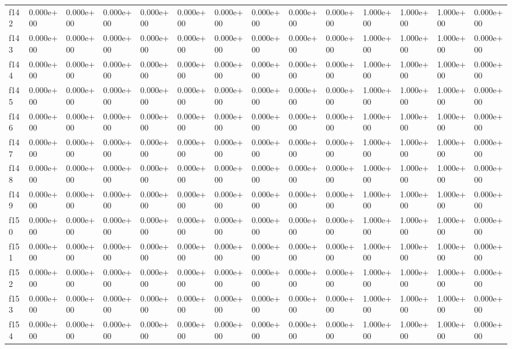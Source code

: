 \begin{table}
\begin{tabular}{llllllllllllll}
f142 & 0.000e+00 & 0.000e+00 & 0.000e+00 & 0.000e+00 & 0.000e+00 & 0.000e+00 & 0.000e+00 & 0.000e+00 & 0.000e+00 & 1.000e+00 & 1.000e+00 & 1.000e+00 & 0.000e+00 \\
f143 & 0.000e+00 & 0.000e+00 & 0.000e+00 & 0.000e+00 & 0.000e+00 & 0.000e+00 & 0.000e+00 & 0.000e+00 & 0.000e+00 & 1.000e+00 & 1.000e+00 & 1.000e+00 & 0.000e+00 \\
f144 & 0.000e+00 & 0.000e+00 & 0.000e+00 & 0.000e+00 & 0.000e+00 & 0.000e+00 & 0.000e+00 & 0.000e+00 & 0.000e+00 & 1.000e+00 & 1.000e+00 & 1.000e+00 & 0.000e+00 \\
f145 & 0.000e+00 & 0.000e+00 & 0.000e+00 & 0.000e+00 & 0.000e+00 & 0.000e+00 & 0.000e+00 & 0.000e+00 & 0.000e+00 & 1.000e+00 & 1.000e+00 & 1.000e+00 & 0.000e+00 \\
f146 & 0.000e+00 & 0.000e+00 & 0.000e+00 & 0.000e+00 & 0.000e+00 & 0.000e+00 & 0.000e+00 & 0.000e+00 & 0.000e+00 & 1.000e+00 & 1.000e+00 & 1.000e+00 & 0.000e+00 \\
f147 & 0.000e+00 & 0.000e+00 & 0.000e+00 & 0.000e+00 & 0.000e+00 & 0.000e+00 & 0.000e+00 & 0.000e+00 & 0.000e+00 & 1.000e+00 & 1.000e+00 & 1.000e+00 & 0.000e+00 \\
f148 & 0.000e+00 & 0.000e+00 & 0.000e+00 & 0.000e+00 & 0.000e+00 & 0.000e+00 & 0.000e+00 & 0.000e+00 & 0.000e+00 & 1.000e+00 & 1.000e+00 & 1.000e+00 & 0.000e+00 \\
f149 & 0.000e+00 & 0.000e+00 & 0.000e+00 & 0.000e+00 & 0.000e+00 & 0.000e+00 & 0.000e+00 & 0.000e+00 & 0.000e+00 & 1.000e+00 & 1.000e+00 & 1.000e+00 & 0.000e+00 \\
f150 & 0.000e+00 & 0.000e+00 & 0.000e+00 & 0.000e+00 & 0.000e+00 & 0.000e+00 & 0.000e+00 & 0.000e+00 & 0.000e+00 & 1.000e+00 & 1.000e+00 & 1.000e+00 & 0.000e+00 \\
f151 & 0.000e+00 & 0.000e+00 & 0.000e+00 & 0.000e+00 & 0.000e+00 & 0.000e+00 & 0.000e+00 & 0.000e+00 & 0.000e+00 & 1.000e+00 & 1.000e+00 & 1.000e+00 & 0.000e+00 \\
f152 & 0.000e+00 & 0.000e+00 & 0.000e+00 & 0.000e+00 & 0.000e+00 & 0.000e+00 & 0.000e+00 & 0.000e+00 & 0.000e+00 & 1.000e+00 & 1.000e+00 & 1.000e+00 & 0.000e+00 \\
f153 & 0.000e+00 & 0.000e+00 & 0.000e+00 & 0.000e+00 & 0.000e+00 & 0.000e+00 & 0.000e+00 & 0.000e+00 & 0.000e+00 & 1.000e+00 & 1.000e+00 & 1.000e+00 & 0.000e+00 \\
f154 & 0.000e+00 & 0.000e+00 & 0.000e+00 & 0.000e+00 & 0.000e+00 & 0.000e+00 & 0.000e+00 & 0.000e+00 & 0.000e+00 & 1.000e+00 & 1.000e+00 & 1.000e+00 & 0.000e+00 \\

\end{tabular}
\end{table}
